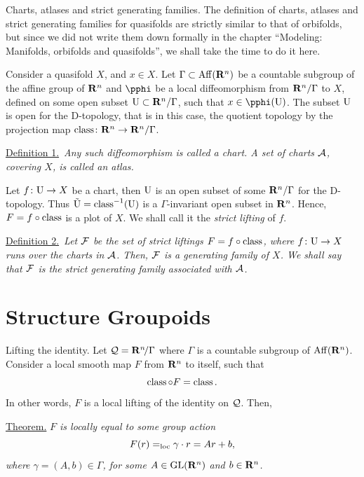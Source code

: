 \begin{Article}{Charts, atlases and strict generating families.}{}
  The definition of charts,
  atlases and strict generating families for quasifolds are strictly similar to that of orbifolds,
  but since we did not write them down formally in the chapter ``Modeling: Manifolds, orbifolds and quasifolds'',
  we shall take the time to do it here.
  
  Consider a quasifold $X$,
  and $x \in X$.
  Let $\Gamma \subset \operatorname{Aff}(\mathbf{R}^n)$ be a countable subgroup of the affine group of $\mathbf{R}^n$ and $\pphi$ be a local diffeomorphism from $\mathbf{R}^n/\Gamma$ to $X$,
  defined on some open subset $\mathrm{U} \subset \mathbf{R}^n/\Gamma$,
  such that $x \in \pphi(\U)$.
  The subset $\mathrm{U}$ is open for the D-topology,
  that is in this case,
  the quotient topology by the projection map $\operatorname{class} \colon \mathbf{R}^n \to \mathbf{R}^n/\Gamma$.
  
  \uline{Definition 1.}~{\itshape Any such diffeomorphism is called a \emph{chart}.
  A set of charts $\mathcal{A}$,
  covering $X$,
  is called an \emph{atlas}.}
  
  Let $f \colon \mathrm{U} \to X$ be a chart,
  then $\mathrm{U}$ is an open subset of some $\mathbf{R}^n/\Gamma$ for the D-topology.
  Thus $\tilde{\mathrm{U}} = \operatorname{class}^{-1}(\mathrm{U})$ is a $\Gamma$-invariant open subset in $\mathbf{R}^n$.
  Hence,
  $F = f \circ \operatorname{class}$ is a plot of $X$.
  We shall call it the \emph{strict lifting} of $f$.
  
  \uline{Definition 2.}~{\itshape Let $\mathcal{F}$ be the set of strict liftings $F = f \circ \operatorname{class}$,
  where $f \colon \mathrm{U} \to X$ runs over the charts in $\mathcal{A}$.
  Then,
  $\mathcal{F}$ is a generating family of $X$.
  We shall say that $\mathcal{F}$ is the \emph{strict generating family} associated with $\mathcal{A}$.}
\end{Article}

\section{Structure Groupoids}

\begin{Article}{Lifting the identity.}{}
  \label{Lifting-the-identity}
  Let $\mathcal{Q} = \mathbf{R}^n\!/\Gamma$ where $\Gamma$ is a countable subgroup of $\operatorname{Aff}(\mathbf{R}^n)$.
  Consider a local smooth map $F$ from $\mathbf{R}^n$ to itself,
  such that
  \[
    \operatorname{class} \circ F = \operatorname{class}.
    \]
  In other words,
  $F$ is a local lifting of the identity on $\mathcal{Q}$.
  Then,
  
  \uline{Theorem.} {\itshape $F$ is locally equal to some group action
  \[
    F(r) =_{\mathrm{loc}} \gamma \cdot r = A r + b,
    \]
  where $\gamma = (A,b) \in \Gamma$,
  for some $A \in \mathrm{GL}(\mathbf{R}^n)$ and $b \in \mathbf{R}^n$.}
\end{Article} %

